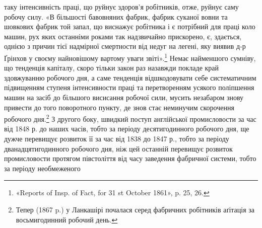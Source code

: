 \parcont{}  %
таку інтенсивність праці, що руйнує здоров’я робітників, отже,
руйнує саму робочу силу. «В більшості бавовняних фабрик, фабрик
суканої вовни та шовкових фабрик той запал, що виснажує
робітника і є потрібний для праці коло машин, рух яких останніми
роками так надзвичайно прискорено, є, здається, однією
з причин тієї надмірної смертности від недуг на легені, яку виявив
д-р Ґрінхов у своєму найновішому вартому уваги звіті».\footnote{
«Reports of Insp. of Fact, for 31 st October 1861», p. 25, 26.
}
Немає найменшого сумніву, що тенденція капіталу, скоро тільки
закон раз назавжди покладе край здовжуванню робочого дня,
а саме тенденція відшкодовувати себе систематичним підвищенням
ступеня інтенсивности праці та перетворенням усякого поліпшення
машин на засіб до більшого висисання робочої сили, мусить
незабаром знову привести до того поворотного пункту, де знов
стає неминучим скорочення робочого дня.\footnote{
Тепер (1867 p.) у Ланкашірі почалася серед фабричних робітників
аґітація за восьмигодинний робочий день.
} З другого боку,
швидкий поступ англійської промисловости за час від 1848 р. до
наших часів, тобто за періоду десятигодинного робочого дня, ще
дужче перевищує розвиток її за час від 1838 до 1847 р., тобто за
періоду дванадцятигодинного робочого дня, ніж цей останній
перевищує розвиток промисловости протягом півстоліття від часу
заведення фабричної системи, тобто за періоду необмеженого
